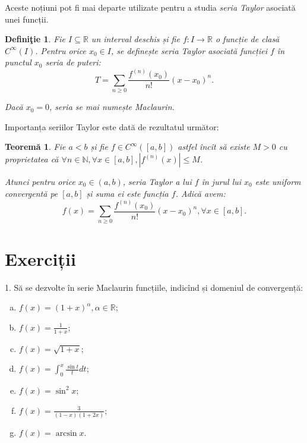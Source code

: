 \documentclass[11pt,a4paper]{article}
\newcommand\ds{\displaystyle}
\newcommand\seq{\subseteq}
\newcommand\NN{\mathbb{N}}
\newcommand\RR{\mathbb{R}}
\theoremstyle{dotless}
\newtheorem{theorem}{Teorem\u{a}}[section]
\theoremstyle{dotlessdr}
\newtheorem{definition}{Defini\c{t}ie}[section]
\begin{document}
Aceste noțiuni pot fi mai departe utilizate pentru a studia \emph{seria Taylor}
asociată unei funcții.

\begin{definition}\label{def:seria-taylor}
  Fie $I \seq \RR$ un interval deschis și fie $f : I \to \RR$ o funcție de clasă
  $C^\infty(I)$. Pentru orice $x_0 \in I$, se definește \emph{seria Taylor} asociată
  funcției $f$ în punctul $x_0$ seria de puteri:
  \[
    T = \sum_{n \geq 0} \frac{f^{(n)}(x_0)}{n!} (x - x_0)^n.
  \]

  Dacă $x_0 = 0$, seria se mai numește \emph{Maclaurin}.
\end{definition}

Importanța seriilor Taylor este dată de rezultatul următor:

\begin{theorem}\label{thm:serie-taylor}
  Fie $a < b$ și fie $f \in C^\infty([a, b])$ astfel încît să existe $M > 0$ cu
  proprietatea că $\forall n \in \NN, \forall x \in [a, b], |f^{(n)}(x) | \leq M$.

  Atunci pentru orice $x_0 \in (a, b)$, seria Taylor a lui $f$ în jurul lui $x_0$
  este uniform convergentă pe $[a, b]$ și suma ei este funcția $f$. Adică avem:
  \[
    f(x) = \sum_{n \geq 0} \frac{f^{(n)}(x_0)}{n!} (x - x_0)^n, \forall x \in [a, b].
  \]
\end{theorem}


\section{Exerciții}
\label{sec:exc}

1. Să se dezvolte în serie Maclaurin funcțiile, indicînd și domeniul de convergență:
\begin{enumerate}[(a)]
\item $f(x) = (1 + x)^\alpha, \alpha \in \RR$;
\item $f(x) = \frac{1}{1 + x}$;
\item $f(x) = \sqrt{1 + x}$;
\item $f(x) = \ds\int_0^x \frac{\sin t}{t} dt$;
\item $f(x) = \sin^2 x$;
\item $f(x) = \frac{3}{(1 - x)(1 + 2x)}$;
\item $f(x) = \arcsin x$.
\end{enumerate}

\vspace{1cm}
\end{document}
